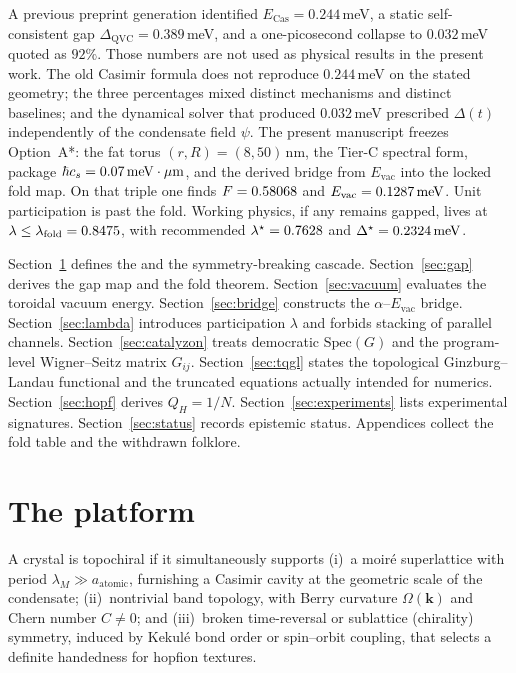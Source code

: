 \documentclass[11pt,letterpaper]{article}
\begin{document}
A previous preprint generation identified $E_{\mathrm{Cas}}=0.244$\,meV, a static self-consistent gap $\Delta_{\mathrm{QVC}}=0.389$\,meV, and a one-picosecond collapse to $0.032$\,meV quoted as $92\%$. Those numbers are not used as physical results in the present work. The old Casimir formula does not reproduce $0.244$\,meV on the stated geometry; the three percentages mixed distinct mechanisms and distinct baselines; and the dynamical solver that produced $0.032$\,meV prescribed $\Delta(t)$ independently of the condensate field $\psi$. The present manuscript freezes Option~A*: the fat torus $(r,R)=(8,50)$\,nm, the Tier-C spectral form, package $\hbar c_s=0.07\,\mathrm{meV\cdot\mu m}$, and the derived bridge from $E_{\mathrm{vac}}$ into the locked fold map. On that triple one finds $F=0.58068$ and $E_{\mathrm{vac}}=0.1287\,\mathrm{meV}$. Unit participation is past the fold. Working physics, if any remains gapped, lives at $\lambda\le\lambda_{\mathrm{fold}}=0.8475$, with recommended $\lambda^\star=0.7628$ and $\Delta^\star=0.2324\,\mathrm{meV}$.

Section~\ref{sec:tevc} defines the \TEVC{} and the symmetry-breaking cascade. Section~\ref{sec:gap} derives the gap map and the fold theorem. Section~\ref{sec:vacuum} evaluates the toroidal vacuum energy. Section~\ref{sec:bridge} constructs the $\alpha$--$E_{\mathrm{vac}}$ bridge. Section~\ref{sec:lambda} introduces participation $\lambda$ and forbids stacking of parallel channels. Section~\ref{sec:catalyzon} treats democratic $\mathrm{Spec}(G)$ and the program-level Wigner--Seitz matrix $G_{ij}$. Section~\ref{sec:tqgl} states the topological Ginzburg--Landau functional and the truncated equations actually intended for numerics. Section~\ref{sec:hopf} derives $Q_H=1/N$. Section~\ref{sec:experiments} lists experimental signatures. Section~\ref{sec:status} records epistemic status. Appendices collect the fold table and the withdrawn folklore.

\section{The \TEVC{} platform}
\label{sec:tevc}

\begin{definition}[Topochirality]
A crystal is topochiral if it simultaneously supports (i)~a moir\'e superlattice with period $\lambda_M\gg a_{\mathrm{atomic}}$, furnishing a Casimir cavity at the geometric scale of the condensate; (ii)~nontrivial band topology, with Berry curvature $\Omega(\mathbf{k})$ and Chern number $C\neq 0$; and (iii)~broken time-reversal or sublattice (chirality) symmetry, induced by Kekul\'e bond order or spin--orbit coupling, that selects a definite handedness for hopfion textures.
\end{definition}
\end{document}
